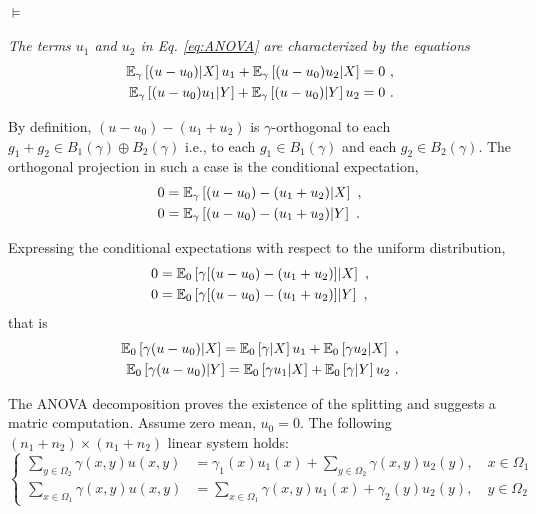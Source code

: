\documentclass[runningheads]{llncs}
\begin{document}
\paragraph{$\bm\models$}\emph{The terms $u_1$ and $u_2$ in Eq. \cref{eq:ANOVA} are characterized by the equations
%
\begin{equation}
\label{eq:projetion}
  \begin{aligned}
    \condexpectat \gamma {(u - u_0)} X u_1 + \condexpectat \gamma {(u-u_0)u_2} X &= 0 \ , \\
    \condexpectat \gamma {(u - u_0)u_1} Y + \condexpectat \gamma {(u-u_0)} Y u_2 &= 0 \ .
  \end{aligned}
%
\end{equation}}

By definition, $(u - u_0) - (u_1 + u_2)$ is $\gamma$-orthogonal to each $g_1+g_2 \in B_1(\gamma)\oplus B_2(\gamma)$ i.e., to each $g_1 \in B_1(\gamma)$ and each $g_2 \in B_2(\gamma)$. The orthogonal projection in such a case is the conditional expectation,
%
  \begin{align*}
    0 &= {\operatorname{\mathbb E}}_{\gamma}\left[(u-u_0) - (u_1+u_2) \middle| X\right]  \ , \\
   0 &= {\operatorname{\mathbb E}}_{\gamma}\left[(u-u_0) - (u_1+u_2) \middle| Y\right] \ .
  \end{align*}

Expressing the conditional expectations with respect to the uniform distribution,
%
  \begin{align*}
    0 &= {\operatorname{\mathbb E}}_{0}\left[\gamma[(u-u_0) - (u_1+u_2)] \middle| X\right] \ , \\
   0 &= {\operatorname{\mathbb E}}_{0}\left[\gamma[(u-u_0) - (u_1+u_2)] \middle| Y\right] \ ,
  \end{align*}
that is
%
  \begin{align*}
  {\operatorname{\mathbb E}}_{0}\left[\gamma(u-u_0) \middle| X\right] =  {\operatorname{\mathbb E}}_{0}\left[\gamma \middle| X\right] u_1 + {\operatorname{\mathbb E}}_{0}\left[\gamma u_2 \middle| X\right] \ , \\
    {\operatorname{\mathbb E}}_{0}\left[\gamma(u-u_0) \middle| Y\right] =  {\operatorname{\mathbb E}}_{0}\left[\gamma u_1 \middle| X\right]  + {\operatorname{\mathbb E}}_{0}\left[\gamma \middle| Y\right] u_2\ .
  \end{align*}

The ANOVA decomposition proves the existence of the splitting and suggests a matric computation. Assume zero mean, $u_0=0$. The following $(n_1+n_2)\times(n_1+n_2)$ linear system holds:
%
\begin{equation*}
\begin{cases}
  \sum_{y \in \Omega_2} \gamma(x,y)u(x,y) &= \gamma_1(x) u_1(x) + \sum_{y \in \Omega_2} \gamma(x,y) u_2(y) , \quad x \in \Omega_1 \\
  \sum_{x \in \Omega_1} \gamma(x,y)u(x,y) &= \sum_{x \in \Omega_1} \gamma(x,y) u_1(x)  + \gamma_2(y)u_2(y) , \quad y \in \Omega_2
\end{cases}
\end{equation*}
%
\end{document}
